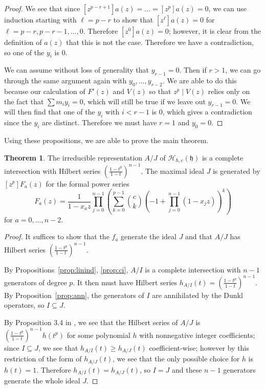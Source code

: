\documentclass{amsart}
\numberwithin{equation}{section}
\theoremstyle{definition}
\newtheorem{theorem}[equation]{Theorem}
\newcommand{\h}{\mathfrak{h}}
\newcommand{\HH}{\mathcal{H}}
\begin{document}
\begin{proof}
We see that since $[z^{p-r+1}]a(z)=\dots=[z^p]a(z)=0$, we can use induction starting with $\ell=p-r$ to show that $[z^\ell]a(z)=0$ for $\ell=p-r,p-r-1,\dots,0$. Therefore $[z^0]a(z)=0$; however, it is clear from the definition of $a(z)$ that this is not the case. Therefore we have a contradiction, so one of the $y_i$ is $0$.

We can assume without loss of generality that $y_{r-1}=0$. Then if $r>1$, we can go through the same argument again with $y_0,\dots,y_{r-2}$. We are able to do this because our calculation of $F'(z)$ and $V(z)$ so that $z^p \mid V(z)$ relies only on the fact that $\sum m_iy_i=0$, which will still be true if we leave out $y_{r-1}=0$. We will then find that one of the $y_i$ with $i < r-1$ is $0$, which gives a contradiction since the $y_i$ are distinct. Therefore we must have $r=1$ and $y_0=0$. 
\end{proof}

Using these propositions, we are able to prove the main theorem.

\begin{theorem}\label{thm:main} The irreducible representation $A/J$  of $\HH_{\hbar,c}(\h)$ is a complete intersection with  Hilbert series $\left(\frac{1-t^p}{1-t}\right)^{n-1}$. The maximal ideal $J$ is generated by $[z^p]F_a(z)$ for the formal power series $$F_a(z)=\frac{1}{1-x_az} \prod_{j=0}^{n-1}\left( \sum_{k=0}^{p-1} \binom{c}{k}(-1+\prod_{j=0}^{n-1} (1-x_jz))^k\right)$$ for $a=0,\dots,n-2$.  \end{theorem} 

\begin{proof} It suffices to show that the $f_a$ generate the ideal $J$ and that $A/J$ has Hilbert series $\left(\frac{1-t^p}{1-t}\right)^{n-1}$. 

By Propositions~\ref{prop:linind}, \ref{prop:ci}, $A/I$ is a complete intersection with $n-1$ generators of degree $p$. It then must have Hilbert series $h_{A/I}(t)=\left(\frac{1-t^p}{1-t}\right)^{n-1}$. By Proposition~\ref{prop:ann}, the generators of $I$ are annihilated by the Dunkl operators, so $I \subseteq J$.

By Proposition 3.4 in \cite{BC1}, we see that the Hilbert series of $A/J$ is $\left(\frac{1-t^p}{1-t}\right)^{n-1}h(t^p)$ for some polynomial $h$ with nonnegative integer coefficients; since $I \subseteq J$, we see that $h_{A/I}(t) \ge h_{A/J}(t)$ coefficient-wise; however by this restriction of the form of $h_{A/J}(t)$, we see that the only possible choice for $h$ is $h(t)=1$. Therefore $h_{A/I}(t)=h_{A/J}(t)$, so $I=J$ and these $n-1$ generators generate the whole ideal $J$.
\end{proof}



\end{document}

